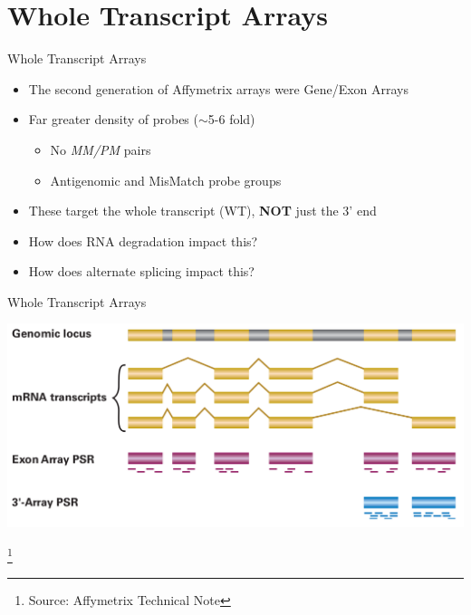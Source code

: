 \documentclass[aspectratio=169,11pt]{beamer}
\newcommand\blfootnote[1]{%
  \begingroup
  \renewcommand\thefootnote{}\footnote{#1}%
  \addtocounter{footnote}{-1}%
  \endgroup
}
\begin{document}
\section{Whole Transcript Arrays}

\begin{frame}{Whole Transcript Arrays}

	\begin{itemize}
		\item The second generation of Affymetrix arrays were Gene/Exon Arrays
		\item Far greater density of probes ($\sim$5-6 fold)
		\begin{itemize}
			\item No \textit{MM/PM} pairs
			\item Antigenomic and MisMatch probe groups
		\end{itemize}
		\item These target the whole transcript (WT), \textbf{NOT} just the 3' end
		\item How does RNA degradation impact this?
		\item How does alternate splicing impact this?
	\end{itemize}

\end{frame}

\begin{frame}{Whole Transcript Arrays}

	\begin{center}
	\includegraphics[scale=0.22]{figures/ArrayProbeLayout.png} 
	\end{center}

\blfootnote{Source: Affymetrix Technical Note}	

\end{frame}
\end{document}
